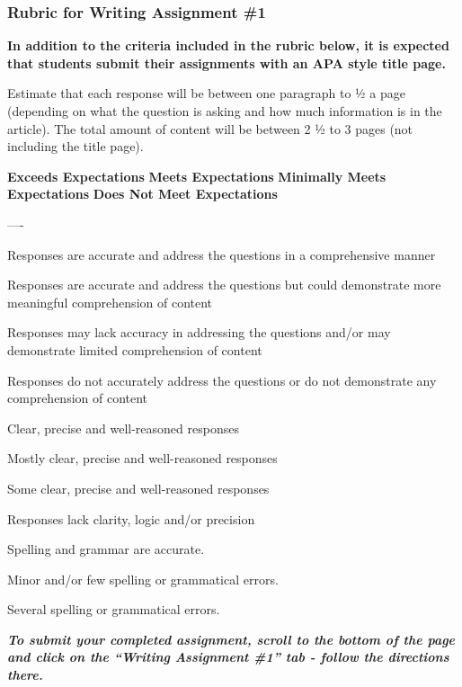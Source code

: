 \documentclass[
]{book}
\begin{document}
\hypertarget{rubric-for-writing-assignment-1}{%
\subsubsection*{Rubric for Writing Assignment \#1}\label{rubric-for-writing-assignment-1}}

\textbf{In addition to the criteria included in the rubric below, it is expected that students submit their assignments with an APA style title page.}

Estimate that each response will be between one paragraph to ½ a page (depending on what the question is asking and how much information is in the article). The total amount of content will be between 2 ½ to 3 pages (not including the title page).

\textbf{Exceeds Expectations} \textbar{} \textbf{Meets Expectations} \textbar{} \textbf{Minimally Meets Expectations} \textbar{} \textbf{Does Not Meet Expectations} \textbar{}

\textbar\textbar--\textbar--\textbar-\textbar{}
\textbar{}

Responses are accurate and address the questions in a comprehensive manner \textbar{}

Responses are accurate and address the questions but could demonstrate more meaningful comprehension of content \textbar{}

Responses may lack accuracy in addressing the questions and/or may demonstrate limited comprehension of content \textbar{}

Responses do not accurately address the questions or do not demonstrate any comprehension of content \textbar{}
\textbar{}

Clear, precise and well-reasoned responses \textbar{}

Mostly clear, precise and well-reasoned responses \textbar{}

Some clear, precise and well-reasoned responses \textbar{}

Responses lack clarity, logic and/or precision \textbar{}
\textbar{} \textbar{}

Spelling and grammar are accurate. \textbar{}

Minor and/or few spelling or grammatical errors. \textbar{}

Several spelling or grammatical errors. \textbar{}

\textbf{\emph{To submit your completed assignment, scroll to the bottom of the page and click on the ``Writing Assignment \#1'' tab - follow the directions there.}}
\end{document}
